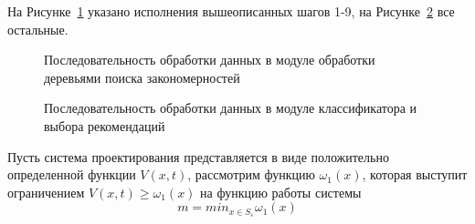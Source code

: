 На Рисунке~\cref{fig:NN1} указано исполнения вышеописанных шагов 1-9, на Рисунке~\cref{fig:NN2} все остальные.
\begin{figure}[ht]
    \caption{Последовательность обработки данных в модуле обработки деревьями поиска закономерностей}\label{fig:NN1}
\end{figure}
\begin{figure}[ht]
    \caption{Последовательность обработки данных в модуле классификатора и выбора рекомендаций}\label{fig:NN2}
\end{figure}



Пусть система проектирования представляется в виде положительно определенной функции $V(x,t)$, рассмотрим функцию $\omega_1(x)$, которая выступит ограничением $V(x,t) \geq \omega_1(x)$ на функцию работы системы
\begin{equation}
    \label{eq:equation49}
    m = min_{x \in S_{\varepsilon}}\omega_1(x)
\end{equation}

